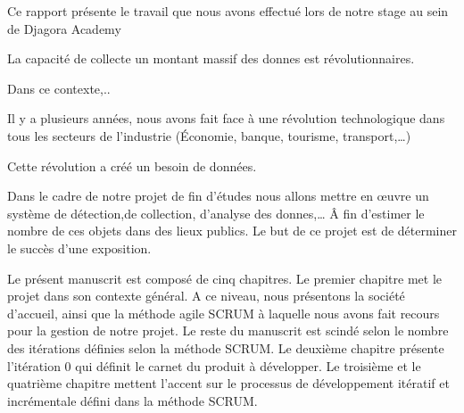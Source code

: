 
Ce rapport présente le travail que nous avons effectué lors de notre stage au sein de
Djagora Academy

La capacité de collecte un montant massif des donnes est révolutionnaires.

Dans ce contexte,..

 Il y a plusieurs années, nous avons fait face à une révolution technologique
 dans tous les secteurs de l'industrie (Économie, banque, tourisme, transport,\ldots)


Cette révolution a créé un besoin de données.



Dans le cadre de notre projet de fin d’études nous allons mettre en œuvre un système de
détection,de collection, d'analyse des donnes,\ldots
Â fin d’estimer le nombre de ces objets dans des lieux publics.
Le but de ce projet est de déterminer
le succès d’une exposition.

Le présent manuscrit est composé de cinq chapitres. Le premier chapitre met le
projet dans son contexte général. A ce niveau, nous présentons la société d’accueil,
ainsi que la méthode agile SCRUM à laquelle nous
avons fait recours pour la gestion de notre projet.
Le reste du manuscrit est scindé selon
le nombre des itérations définies selon la méthode SCRUM. Le deuxième chapitre
présente l’itération 0 qui définit le carnet du produit à développer. Le troisième et le
quatrième chapitre mettent l’accent sur le processus de développement itératif et
incrémentale défini dans la méthode SCRUM.